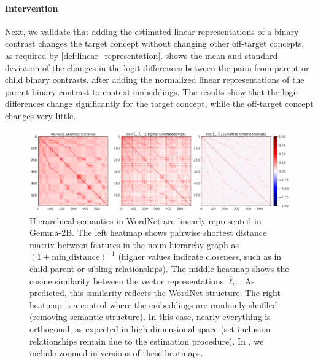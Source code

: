 \documentclass{article}
\begin{document}
\paragraph{Intervention}
Next, we validate that adding the estimated linear representations of a binary contrast changes the target concept without changing other off-target concepts, as required by \cref{def:linear_representation}.
 shows the mean and standard deviation of the changes in the logit differences between the pairs from parent or child binary contrasts, after adding the normalized linear representations of the parent binary contrast to context embeddings.
The results show that the logit differences change significantly for the target concept, while the off-target concept changes very little.



\begin{figure}[t]
  \centering
  \includegraphics[width=1.0\linewidth]{figures/heatmap_noun_gemma.pdf}
  \caption{Hierarchical semantics in WordNet are linearly represented in Gemma-2B.
  The left heatmap shows pairwise shortest distance matrix between features in the noun hierarchy graph as $(1+ \text{min\_distance})^{-1}$ (higher values indicate closeness, such as in child-parent or sibling relationships).
  The middle heatmap shows the cosine similarity between the vector representations $\bar\ell_w$. As predicted, this similarity reflects the WordNet structure. The right heatmap is a control where the embeddings are randomly shuffled (removing semantic structure). In this case, nearly everything is orthogonal, as expected in high-dimensional space (set inclusion relationships remain due to the estimation procedure). In , we include zoomed-in versions of these heatmaps.}
  \label{fig:heatmap_noun_gemma}
\end{figure}
\end{document}
